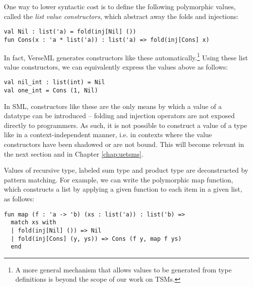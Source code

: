 One way to lower syntactic cost is to define the following polymorphic values, called the \emph{list value constructors}, which abstract away the folds and injections:
\begin{lstlisting}[numbers=none]
val Nil : list('a) = fold(inj[Nil] ())
fun Cons(x : 'a * list('a)) : list('a) => fold(inj[Cons] x)
\end{lstlisting}
In fact, VerseML generates constructors like these automatically.\footnote{A more general mechanism that allows values to be generated from type definitions is beyond the scope of our work on TSMs.} 
Using these list value constructors, we can equivalently express the values above as follows:
\begin{lstlisting}[numbers=none]
val nil_int : list(int) = Nil
val one_int = Cons (1, Nil)
\end{lstlisting}
In SML, constructors like these are the only means by which a value of a datatype can be introduced -- folding and injection operators are not exposed directly to programmers. As such, it is not possible to construct a value of a type like  in a context-independent manner, i.e. in contexts where the value constructors have been shadowed or are not bound. This will become relevant in the next section and in Chapter \ref{chap:uetsms}. %

Values of recursive type, labeled sum type and product type are deconstructed by pattern matching. %
For example, we can write the polymorphic map function, which constructs a  list by applying a given function to each item in a given list, as follows:
\begin{lstlisting}[numbers=none]
fun map (f : 'a -> 'b) (xs : list('a)) : list('b) => 
  match xs with 
  | fold(inj[Nil] ()) => Nil
  | fold(inj[Cons] (y, ys)) => Cons (f y, map f ys)
  end
\end{lstlisting}


